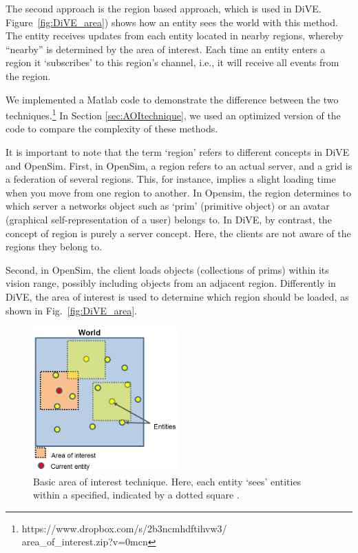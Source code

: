 \documentclass[]{elsarticle}
\begin{document}
The second approach is the region based approach, which is used in DiVE. Figure~\ref{fig:DiVE_area}) shows how an entity sees the world with this method. The entity receives updates from each entity located in nearby regions, whereby ``nearby'' is determined by the area of interest. Each time an entity enters a region it `subscribes' to this region's channel, i.e., it will receive all events from the region.

We implemented a Matlab code to demonstrate the difference between the two techniques.\footnote{https://www.dropbox.com/s/2b3ncmhdftihvw3/\\area\_of\_interest.zip?v=0mcn}
In Section \ref{sec:AOItechnique}, we used an optimized version of the code to compare the complexity of these methods.

It is important to note that the term `region' refers to different concepts in DiVE and OpenSim.
First, in OpenSim, a region refers to an actual server, and a grid is a federation of several regions. This, for instance, implies a slight loading time when you move from one region to another. In Opensim, the region determines to which server a networks object such as `prim' (primitive object) or an avatar (graphical self-representation of a user) belongs to.
In DiVE, by contrast, the concept of region is purely a server concept. Here, the clients are not aware of the regions they belong to.

Second, in OpenSim, the client loads objects (collections of prims) within its vision range, possibly including objects from an adjacent region. Differently in DiVE, the area of interest is used to determine which region should be loaded, as shown in Fig.~\ref{fig:DiVE_area}.

\begin{figure}[t]
\centering
\includegraphics[width=0.5\textwidth]{acm-vrst13-img/basic_area_of_interest.png}
\caption{Basic area of interest technique. Here, each entity `sees' entities within a specified, indicated by a dotted square \cite{Prendinger+others.2014}.}
\label{fig:basic_area}
\end{figure}
\end{document}
